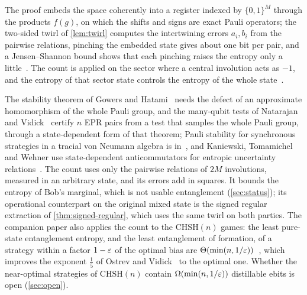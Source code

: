 The proof embeds the space coherently into a register indexed by $\{0,1\}^M$ through the products $f(g)$, on which the shifts
and signs are exact Pauli operators; the two-sided twirl of \cref{lem:twirl} computes the intertwining errors $a_i,b_i$ from the
pairwise relations, pinching the embedded state gives about one bit per pair, and a Jensen--Shannon bound shows that each
pinching raises the entropy only a little~\cite[Section~4]{DM-game}. The count is applied on the sector where a central
involution acts as $-1$, and the entropy of that sector state controls the entropy of the whole state~\cite[Lemma~4.9]{DM-game}.

\begin{remark}[Comparison]\label{rem:count-comparison}
The stability theorem of Gowers and Hatami~\cite{GH17} needs the defect of an approximate homomorphism of the whole Pauli
group, and the many-qubit tests of Natarajan and Vidick~\cite{NV17} certify $n$ EPR pairs from a test that samples the
whole Pauli group, through a state-dependent form of that theorem; Pauli stability for synchronous strategies in a tracial
von Neumann algebra is in~\cite{dlS22}, and Kaniewski, Tomamichel and Wehner use state-dependent anticommutators for entropic
uncertainty relations~\cite{KTW14}. The count uses only the pairwise relations of $2M$ involutions, measured in an arbitrary
state, and its errors add in squares. It bounds the entropy of Bob's marginal, which is not usable entanglement
(\cref{sec:status}); its operational counterpart on the original mixed state is the signed regular extraction of
\cref{thm:signed-regular}, which uses the same twirl on both parties. The companion paper also applies the count to the
$\mathrm{CHSH}(n)$ games: the least pure-state entanglement entropy, and the least entanglement of formation, of a strategy
within a factor $1-\varepsilon$ of the optimal bias are $\Theta(\min(n,1/\varepsilon))$~\cite[Theorem~E]{DM-game}, which improves the
exponent $\frac15$ of Ostrev and Vidick~\cite{OV16} to the optimal one. Whether the near-optimal strategies of $\mathrm{CHSH}(n)$
contain $\Omega(\min(n,1/\varepsilon))$ distillable ebits is open (\cref{sec:open}).
\end{remark}

